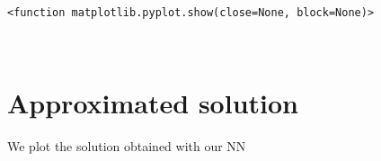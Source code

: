 \documentclass[11pt]{article}
\makeatletter
\newcommand{\boxspacing}{\kern\kvtcb@left@rule\kern\kvtcb@boxsep}
\newcommand{\prompt}[4]{
        {\ttfamily\llap{{\color{#2}[#3]:\hspace{3pt}#4}}\vspace{-\baselineskip}}
    }
\makeatother
\begin{document}
            \begin{tcolorbox}[breakable, size=fbox, boxrule=.5pt, pad at break*=1mm, opacityfill=0]
\prompt{Out}{outcolor}{9}{\boxspacing}
\begin{Verbatim}[commandchars=\\\{\}]
<function matplotlib.pyplot.show(close=None, block=None)>
\end{Verbatim}
\end{tcolorbox}
        
    \begin{center}
    \end{center}
    { \hspace*{\fill} \\}
    
    \hypertarget{approximated-solution}{%
\section{Approximated solution}\label{approximated-solution}}

We plot the solution obtained with our NN
\end{document}
